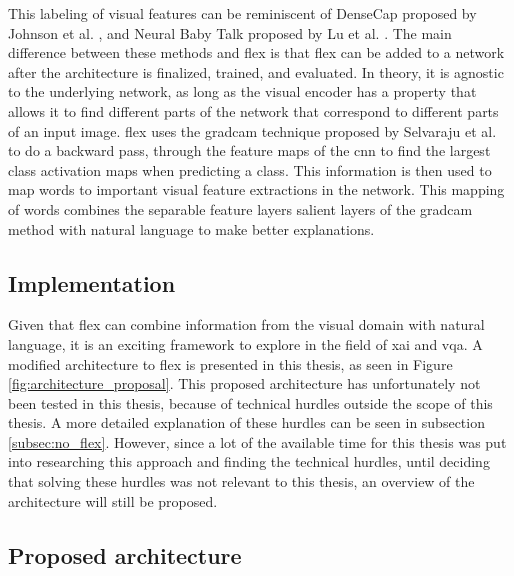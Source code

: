    
        This labeling of visual features can be reminiscent of DenseCap proposed by Johnson et al. \cite{johnsonDenseCapFullyConvolutional2016}, and Neural Baby Talk proposed by Lu et al. \cite{luNeuralBabyTalk2018}. The main difference between these methods and \gls{flex} is that \gls{flex} can be added to a network after the architecture is finalized, trained, and evaluated. In theory, it is agnostic to the underlying network, as long as the visual encoder has a property that allows it to find different parts of the network that correspond to different parts of an input image. \gls{flex} uses the \gls{gradcam} technique proposed by Selvaraju et al. \cite{selvarajuGradCAMVisualExplanations2020} to do a backward pass, through the feature maps of the \gls{cnn} to find the largest class activation maps when predicting a class. This information is then used to map words to important visual feature extractions in the network. This mapping of words combines the separable feature layers salient layers of the \gls{gradcam} method with natural language to make better explanations.


        \subsection{Implementation}
        Given that \gls{flex} can combine information from the visual domain with natural language, it is an exciting framework to explore in the field of \gls{xai} and \gls{vqa}. A modified architecture to \gls{flex} is presented in this thesis, as seen in Figure \ref{fig:architecture_proposal}. This proposed architecture has unfortunately not been tested in this thesis, because of technical hurdles outside the scope of this thesis. A more detailed explanation of these hurdles can be seen in subsection \ref{subsec:no_flex}. However, since a lot of the available time for this thesis was put into researching this approach and finding the technical hurdles, until deciding that solving these hurdles was not relevant to this thesis, an overview of the architecture will still be proposed. 

       

        \subsection{Proposed architecture}
        
